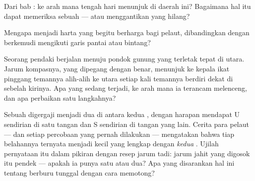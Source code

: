 \begin{exercise}[$\star$]\label{exo:g4:magnets-and-compass:8}
Dari bab : ke arah mana  tengah hari menunjuk
di daerah ini? Bagaimana hal itu dapat memeriksa sebuah  ---
atau menggantikan  yang hilang?
\end{exercise}

\begin{exercise}[$\star$]\label{exo:g4:magnets-and-compass:9}
Mengapa  menjadi harta yang begitu berharga bagi pelaut,
dibandingkan dengan berkemudi mengikuti garis pantai atau bintang?
\end{exercise}

\begin{exercise}[$\star\star$]\label{exo:g4:magnets-and-compass:10}
Seorang pendaki berjalan menuju pondok gunung yang terletak tepat di
utara. Jarum kompasnya, yang dipegang dengan benar, menunjuk ke kepala
ikat pinggang temannya alih-alih ke utara setiap kali temannya berdiri
dekat di sebelah kirinya. Apa yang sedang terjadi, ke arah mana ia
terancam melenceng, dan apa perbaikan satu langkahnya?
\end{exercise}

\begin{exercise}[$\star\star$]\label{exo:g4:magnets-and-compass:11}
Sebuah  digergaji menjadi dua di antara kedua , dengan
harapan mendapat U sendirian di satu tangan dan S sendirian di tangan
yang lain. Cerita para pelaut --- dan setiap percobaan yang pernah
dilakukan --- mengatakan bahwa tiap belahannya ternyata menjadi 
kecil yang lengkap dengan \emph{kedua} . Ujilah pernyataan itu
dalam pikiran dengan resep jarum  tadi: jarum jahit yang digosok
itu pendek --- apakah ia punya satu  atau dua? Apa yang
disarankan hal ini tentang berburu  tunggal dengan cara memotong?
\end{exercise}
